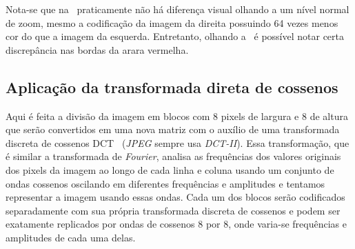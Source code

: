 Nota-se que na~ praticamente não há diferença visual olhando a um nível normal de zoom, mesmo a codificação da imagem da direita possuindo 64 vezes menos cor do que a imagem da esquerda. Entretanto, olhando a~ é possível notar certa discrepância nas bordas da arara vermelha.

\subsection{Aplicação da transformada direta de cossenos}
Aqui é feita a divisão da imagem em blocos com 8 pixels de largura e 8 de altura que serão convertidos em uma nova matriz com o auxílio de uma transformada discreta de cossenos \acrshort{DCT}~\cite{ahmed1974discrete} (\textit{JPEG} sempre usa \emph{DCT-II}). Essa transformação, que é similar a transformada de \textit{Fourier}, analisa as frequências dos valores originais dos pixels da imagem ao longo de cada linha e coluna usando um conjunto de ondas cossenos oscilando em diferentes frequências e amplitudes e tentamos representar a imagem usando essas ondas. Cada um dos blocos serão codificados separadamente com sua própria transformada discreta de cossenos e podem ser exatamente replicados por ondas de cossenos 8 por 8, onde varia-se frequências e amplitudes de cada uma delas. 

